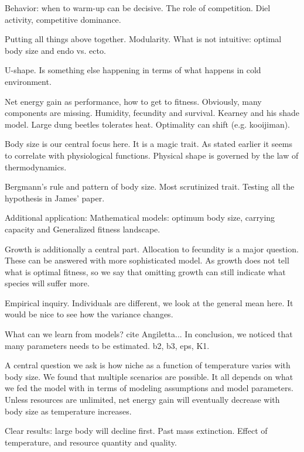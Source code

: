 Behavior: when to warm-up can be decisive.
The role of competition.
Diel activity, competitive dominance.

Putting all things above together.
Modularity.
What is not intuitive: optimal body size and endo vs. ecto.

U-shape.
Is something else happening in terms of what happens in cold environment.
 
Net energy gain as performance, how to get to fitness.
Obviously, many components are missing.
Humidity, fecundity and survival.
Kearney and his shade model.
Large dung beetles tolerates heat.
Optimality can shift (e.g. kooijiman).

Body size is our central focus here.
It is a magic trait.
As stated earlier it seems to correlate with physiological functions.
Physical shape is governed by the law of thermodynamics.

Bergmann's rule and pattern of body size.
Most scrutinized trait.
Testing all the hypothesis in James' paper.

Additional application:
Mathematical models: optimum body size, carrying capacity and 
Generalized fitness landscape.

Growth is additionally a central part.
Allocation to fecundity is a major question. 
These can be answered with more sophisticated model.
As growth does not tell what is optimal fitness, so we say that omitting growth can still indicate what species will suffer more.

Empirical inquiry.
Individuals are different, we look at the general mean here. 
It would be nice to see how the variance changes.

What can we learn from models?
cite Angiletta...
In conclusion, we noticed that many parameters needs to be estimated.
b2, b3, eps, K1.

A central question we ask is how  niche as a function of temperature varies with body size.
We found that multiple scenarios are possible.
It all depends on what we fed the model with in terms of modeling assumptions and model parameters.
Unless resources are unlimited, net energy gain will eventually decrease with body size as temperature increases.

Clear results: large body will decline first.
Past mass extinction.
Effect of temperature, and resource quantity and quality.

